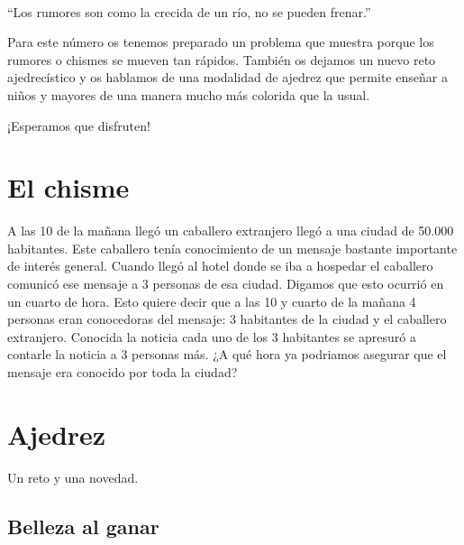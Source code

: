 
\cappar
\
\begin{center}
``Los rumores son como la crecida de un río, no se pueden frenar.''
\end{center}

Para este número os tenemos preparado un problema que muestra porque los rumores o chismes se mueven tan rápidos. También os dejamos un nuevo reto ajedrecístico y os hablamos de una modalidad de ajedrez que permite enseñar a niños y mayores de una manera mucho más colorida que la usual.

 ¡Esperamos que disfruten! 

\section*{El chisme}

A las 10 de la mañana llegó un caballero extranjero llegó a una ciudad de 50.000 habitantes. Este caballero tenía conocimiento de un mensaje bastante importante de interés general. Cuando llegó al hotel donde se iba a hospedar el caballero comunicó ese mensaje a 3 personas de esa ciudad. Digamos que esto ocurrió en un cuarto de hora. Esto quiere decir que a las 10 y cuarto de la mañana 4 personas eran conocedoras del mensaje: 3 habitantes de la ciudad y el caballero extranjero. Conocida la noticia cada uno de los 3 habitantes se apresuró a contarle la noticia a 3 personas más. ¿A qué hora ya podriamos asegurar que el mensaje era conocido por toda la ciudad? 

\section*{Ajedrez}

Un reto y una novedad.

\subsection*{Belleza al ganar}

